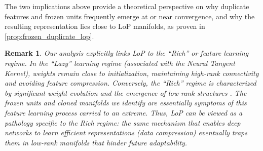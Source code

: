 \documentclass{article}
\newtheorem{remark}{Remark}[section]
\numberwithin{figure}{section}
\begin{document}
The two implications above provide a theoretical perspective on why duplicate features and frozen units frequently emerge at or near convergence, and why the resulting representation lies close to LoP manifolds, as proven in \cref{prop:frozen_duplicate_lop}.

\begin{remark}
Our analysis explicitly links LoP to the ``Rich'' or feature learning regime. In the ``Lazy'' learning regime (associated with the Neural Tangent Kernel), weights remain close to initialization, maintaining high-rank connectivity and avoiding feature compression. Conversely, the ``Rich'' regime is characterized by significant weight evolution and the emergence of low-rank structures \citep{chizat2019lazy, woodworth2020kernel}. The frozen units and cloned manifolds we identify are essentially symptoms of this feature learning process carried to an extreme. Thus, LoP can be viewed as a pathology specific to the Rich regime: the same mechanism that enables deep networks to learn efficient representations (data compression) eventually traps them in low-rank manifolds that hinder future adaptability.
\end{remark}



\end{document}
